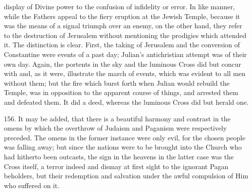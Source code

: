 display of Divine power to the confusion of infidelity or error. In
like manner, while the Fathers appeal to the fiery eruption at the
Jewish Temple, because it was the means of a signal triumph over an
enemy, on the other hand, they refer to the destruction of
Jerusalem without mentioning the prodigies which attended it. The
distinction is clear. First, the taking of Jerusalem and the
conversion of Constantine were events of a past day; Julian's
antichristian attempt was of their own day. Again, the portents in the
sky and the luminous Cross did but concur with and, as it were,
illustrate the march of events, which was evident to all men without
them; but the fire which burst forth when Julian would rebuild the
Temple, was in opposition to the apparent course of things, and
arrested them and defeated them. It did a deed, whereas the luminous
Cross did but herald one.

156.
It may be added, that there is a beautiful harmony and contrast in the
omens by which the overthrow of Judaism and Paganism were respectively
preceded. The omens in the former instance were only evil, for the
chosen people was falling away; but since the nations were to be
brought into the Church who had hitherto been outcasts, the sign in
the heavens in the latter case was the Cross itself, a terror indeed
and dismay at first sight to the ignorant Pagan beholders, but their
redemption and salvation under the awful compulsion of Him who
suffered on it.


